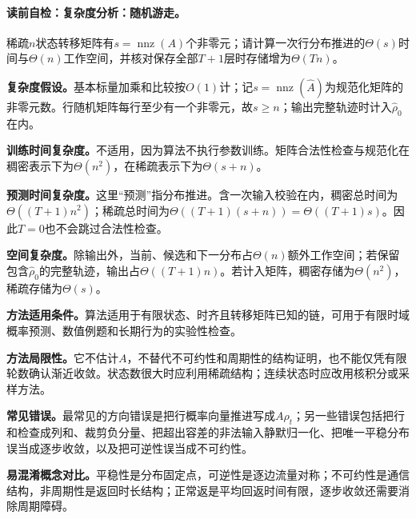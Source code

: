 
\label{struct:V5-C01-CH26}
\label{struct:V5-C01-CH27}
\paragraph{读前自检：复杂度分析：随机游走。}稀疏$n$状态转移矩阵有$s=\operatorname{nnz}(A)$个非零元；请计算一次行分布推进的$\Theta(s)$时间与$\Theta(n)$工作空间，并核对保存全部$T+1$层时存储增为$\Theta(Tn)$。\par

\begin{complexitybox}
\textbf{复杂度假设。}基本标量加乘和比较按$O(1)$计；记$s=\operatorname{nnz}(\widehat A)$为规范化矩阵的非零元数。行随机矩阵每行至少有一个非零元，故$s\ge n$；输出完整轨迹时计入$\widehat\rho_0$在内。

\textbf{训练时间复杂度。}不适用，因为算法不执行参数训练。矩阵合法性检查与规范化在稠密表示下为$\Theta(n^2)$，在稀疏表示下为$\Theta(s+n)$。

\textbf{预测时间复杂度。}这里“预测”指分布推进。含一次输入校验在内，稠密总时间为$\Theta((T+1)n^2)$；稀疏总时间为$\Theta((T+1)(s+n))=\Theta((T+1)s)$。因此$T=0$也不会跳过合法性检查。

\textbf{空间复杂度。}除输出外，当前、候选和下一分布占$\Theta(n)$额外工作空间；若保留包含$\widehat\rho_0$的完整轨迹，输出占$\Theta((T+1)n)$。若计入矩阵，稠密存储为$\Theta(n^2)$，稀疏存储为$\Theta(s)$。
\end{complexitybox}

\label{struct:V5-C01-CH28}
\begin{applicabilitybox}
\textbf{方法适用条件。}算法适用于有限状态、时齐且转移矩阵已知的链，可用于有限时域概率预测、数值例题和长期行为的实验性检查。

\label{struct:V5-C01-CH29}
\textbf{方法局限性。}它不估计$A$，不替代不可约性和周期性的结构证明，也不能仅凭有限轮数确认渐近收敛。状态数很大时应利用稀疏结构；连续状态时应改用核积分或采样方法。

\label{struct:V5-C01-CH30}
\textbf{常见错误。}最常见的方向错误是把行概率向量推进写成$A\rho_t$；另一些错误包括把行和检查成列和、裁剪负分量、把超出容差的非法输入静默归一化、把唯一平稳分布误当成逐步收敛，以及把可逆性误当成不可约性。

\label{struct:V5-C01-CH31}
\textbf{易混淆概念对比。}平稳性是分布固定点，可逆性是逐边流量对称；不可约性是通信结构，非周期性是返回时长结构；正常返是平均回返时间有限，逐步收敛还需要消除周期障碍。
\end{applicabilitybox}

